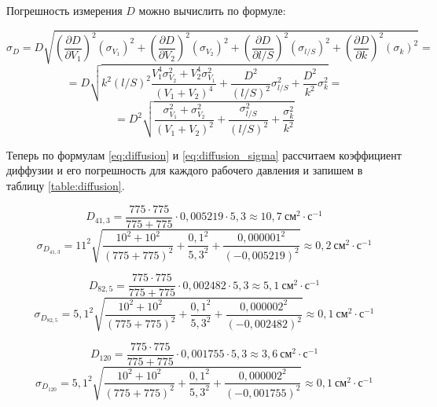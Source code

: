 \documentclass[a4paper,12pt]{article}
\begin{document}
Погрешность измерения $D$ можно вычислить по формуле:

\begin{equation*}
    \sigma_D = D \sqrt{
    \left( \frac{\partial D}{\partial V_1} \right)^2 (\sigma_{V_1})^2 + 
    \left( \frac{\partial D}{\partial V_2} \right)^2 (\sigma_{V_2})^2 + 
    \left( \frac{\partial D}{\partial l/S} \right)^2 (\sigma_{l/S})^2 + 
    \left( \frac{\partial D}{\partial k} \right)^2 (\sigma_{k})^2
    } = 
\end{equation*}
\begin{equation*}
    = D \sqrt{
    k^2 (l/S)^2 \frac{V_1^4\sigma_{V_2}^2 + V_2^4\sigma_{V_1}^2}{\left( V_1 + V_2 \right)^4} + 
    \frac{D^2}{(l/S)^2} \sigma_{l/S}^2 + \frac{D^2}{k^2} \sigma_{k}^2
    } = 
\end{equation*}
\begin{equation}\label{eq:diffusion_sigma}
    = D^2 \sqrt{
    \frac{\sigma_{V_1}^2 + \sigma_{V_2}^2}{\left( V_1 + V_2 \right)^2} + 
    \frac{\sigma_{l/S}^2}{(l/S)^2} + \frac{\sigma_{k}^2}{k^2}
    }
\end{equation}

Теперь по формулам \eqref{eq:diffusion} и \eqref{eq:diffusion_sigma} рассчитаем коэффициент диффузии и его погрешность для каждого рабочего давления и запишем в таблицу \ref{table:diffusion}.

\begin{equation*}
    D_{41,3} = \frac{775 \cdot 775}{775 + 775} \cdot 0,005219 \cdot 5,3 \approx 10,7 \ \text{см}^2 \cdot \text{с}^{-1}
\end{equation*}
\begin{equation*}
    \sigma_{D_{41,3}} = 11^2 \sqrt{
    \frac{10^2 + 10^2}{\left( 775 + 775 \right)^2} + 
    \frac{{0,1}^2}{{5,3}^2} + \frac{{0,000001}^2}{({-0,005219})^2}
    } \approx 0,2 \ \text{см}^2 \cdot \text{с}^{-1}
\end{equation*}

\begin{equation*}
    D_{82,5} = \frac{775 \cdot 775}{775 + 775} \cdot 0,002482 \cdot 5,3 \approx 5,1 \ \text{см}^2 \cdot \text{с}^{-1}
\end{equation*}
\begin{equation*}
    \sigma_{D_{82,5}} = {5,1}^2 \sqrt{
    \frac{10^2 + 10^2}{\left( 775 + 775 \right)^2} + 
    \frac{{0,1}^2}{{5,3}^2} + \frac{{0,000002}^2}{({-0,002482})^2}
    } \approx 0,1 \ \text{см}^2 \cdot \text{с}^{-1}
\end{equation*}

\begin{equation*}
    D_{120} = \frac{775 \cdot 775}{775 + 775} \cdot 0,001755 \cdot 5,3 \approx 3,6 \ \text{см}^2 \cdot \text{с}^{-1}
\end{equation*}
\begin{equation*}
    \sigma_{D_{120}} = {5,1}^2 \sqrt{
    \frac{10^2 + 10^2}{\left( 775 + 775 \right)^2} + 
    \frac{{0,1}^2}{{5,3}^2} + \frac{{0,000002}^2}{({-0,001755})^2}
    } \approx 0,1 \ \text{см}^2 \cdot \text{с}^{-1}
\end{equation*}
\end{document}
